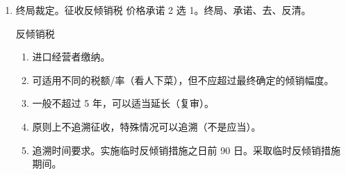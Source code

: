 \begin{enumerate}
\begin{enumerate}
\begin{enumerate}
                        \begin{enumerate}
                          \item 进口经营者承担。
                          \item 终裁确定不征税 \hz 不追溯征税的，应退回，担保应解除。
                          \item 确定征收的。多退少不补。国家可以吃亏，个人不可以。
                        \end{enumerate}
                  \item 终局裁定。征收反倾销税 \hz 价格承诺 2 选 1。终局、承诺、去、反清。
                        \begin{kk}{反倾销税}
                          \begin{enumerate}
                            \item 进口经营者缴纳。
                            \item 可适用不同的税额/率（看人下菜），但不应超过最终确定的倾销幅度。
                            \item 一般不超过 5 年，可以适当延长（复审）。
                            \item 原则上不追溯征收，特殊情况可以追溯（不是应当）。
                            \item 追溯时间要求。\yi 实施临时反倾销措施之日前 90 日。\er 采取临时反倾销措施期间。
                          \end{enumerate}
                        \end{kk}


\end{enumerate}
\end{enumerate}
\end{enumerate}
